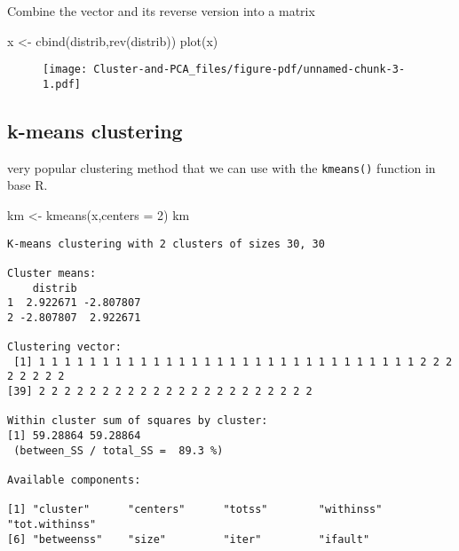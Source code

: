 \documentclass[
  letterpaper,
  DIV=11,
  numbers=noendperiod]{scrartcl}
\newenvironment{Shaded}{\begin{snugshade}}{\end{snugshade}}
\newcommand{\AttributeTok}[1]{\textcolor[rgb]{0.40,0.45,0.13}{#1}}
\newcommand{\DecValTok}[1]{\textcolor[rgb]{0.68,0.00,0.00}{#1}}
\newcommand{\FunctionTok}[1]{\textcolor[rgb]{0.28,0.35,0.67}{#1}}
\newcommand{\NormalTok}[1]{\textcolor[rgb]{0.00,0.23,0.31}{#1}}
\newcommand{\OtherTok}[1]{\textcolor[rgb]{0.00,0.23,0.31}{#1}}
\begin{document}
Combine the vector and its reverse version into a matrix

\begin{Shaded}
\begin{Highlighting}[]
\NormalTok{x }\OtherTok{\textless{}{-}} \FunctionTok{cbind}\NormalTok{(distrib,}\FunctionTok{rev}\NormalTok{(distrib))}
\FunctionTok{plot}\NormalTok{(x)}
\end{Highlighting}
\end{Shaded}

\begin{figure}[H]

{\centering \texttt{[image: Cluster-and-PCA\_files/figure-pdf/unnamed-chunk-3-1.pdf]}

}

\end{figure}

\hypertarget{k-means-clustering}{%
\subsection{k-means clustering}\label{k-means-clustering}}

very popular clustering method that we can use with the
\texttt{kmeans()} function in base R.

\begin{Shaded}
\begin{Highlighting}[]
\NormalTok{km }\OtherTok{\textless{}{-}} \FunctionTok{kmeans}\NormalTok{(x,}\AttributeTok{centers =} \DecValTok{2}\NormalTok{)}
\NormalTok{km}
\end{Highlighting}
\end{Shaded}

\begin{verbatim}
K-means clustering with 2 clusters of sizes 30, 30

Cluster means:
    distrib          
1  2.922671 -2.807807
2 -2.807807  2.922671

Clustering vector:
 [1] 1 1 1 1 1 1 1 1 1 1 1 1 1 1 1 1 1 1 1 1 1 1 1 1 1 1 1 1 1 1 2 2 2 2 2 2 2 2
[39] 2 2 2 2 2 2 2 2 2 2 2 2 2 2 2 2 2 2 2 2 2 2

Within cluster sum of squares by cluster:
[1] 59.28864 59.28864
 (between_SS / total_SS =  89.3 %)

Available components:

[1] "cluster"      "centers"      "totss"        "withinss"     "tot.withinss"
[6] "betweenss"    "size"         "iter"         "ifault"      
\end{verbatim}
\end{document}
